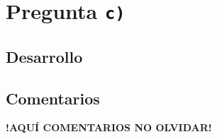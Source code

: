 \section{Pregunta \texttt{c)}}\label{pregunta-c}

\subsection{Desarrollo}

\FloatBarrier
\subsection{Comentarios}


\textbf{!AQUÍ COMENTARIOS NO OLVIDAR!}